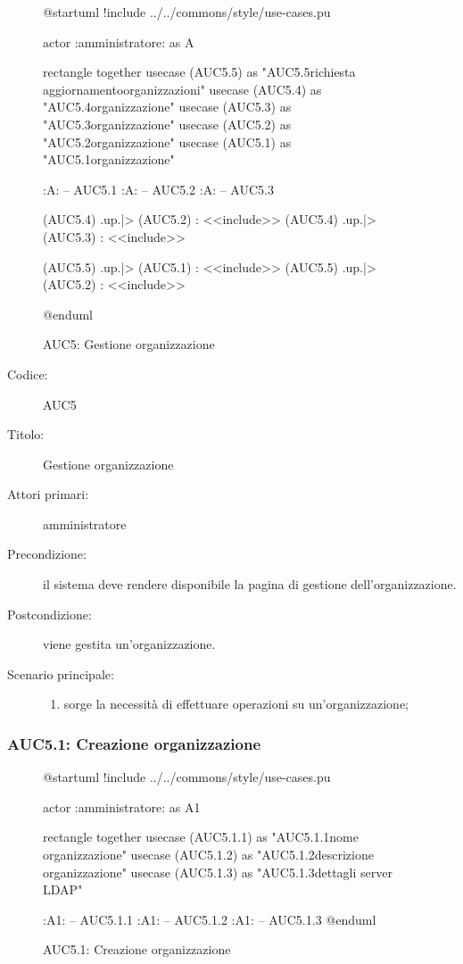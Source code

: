 \documentclass[../../../analisi-dei-requisiti.tex]{subfiles}
\begin{document}
\begin{figure}[H]
  \centering
  \begin{plantuml}
  @startuml
  !include ../../commons/style/use-cases.pu

  actor :amministratore: as A

  rectangle {
    together {
      usecase (AUC5.5) as "AUC5.5\nInvio richiesta aggiornamento\nlista organizzazioni"
      usecase (AUC5.4) as "AUC5.4\nSeleziona organizzazione"
      usecase (AUC5.3) as "AUC5.3\nModifica organizzazione"
      usecase (AUC5.2) as "AUC5.2\nEliminazione organizzazione"
      usecase (AUC5.1) as "AUC5.1\nCreazione organizzazione"
    }
  }

  :A: -- AUC5.1
  :A: -- AUC5.2
  :A: -- AUC5.3

  (AUC5.4) .up.|> (AUC5.2) : <<include>>
  (AUC5.4) .up.|> (AUC5.3) : <<include>>

  (AUC5.5) .up.|> (AUC5.1) : <<include>>
  (AUC5.5) .up.|> (AUC5.2) : <<include>>

  @enduml
  \end{plantuml}
  \caption{AUC5: Gestione organizzazione}
  \label{fig:AUC5}
\end{figure}

\begin{description}
  \item[Codice:] AUC5
  \item[Titolo:] Gestione organizzazione
  \item[Attori primari:] amministratore
  \item[Precondizione:] il sistema deve rendere disponibile la pagina di gestione dell'organizzazione.
  \item[Postcondizione:] viene gestita un'organizzazione.
  \item[Scenario principale:]
  \begin{enumerate}
    \item sorge la necessità di effettuare operazioni su un'organizzazione;
  \end{enumerate}
\end{description}

\subsubsection{AUC5.1: Creazione organizzazione}%
  \label{subs:AUC5.1}

  \begin{figure}[H]
    \centering
    \begin{plantuml}
    @startuml
    !include ../../commons/style/use-cases.pu

    actor :amministratore: as A1

    rectangle {
      together {
        usecase (AUC5.1.1) as "AUC5.1.1\nInserisci nome organizzazione"
        usecase (AUC5.1.2) as "AUC5.1.2\nInserisci descrizione organizzazione"
        usecase (AUC5.1.3) as "AUC5.1.3\nConfigurazione dettagli server LDAP"
      }
    }

    :A1: -- AUC5.1.1
    :A1: -- AUC5.1.2
    :A1: -- AUC5.1.3
    @enduml
    \end{plantuml}
    \caption{AUC5.1: Creazione organizzazione}
    \label{fig:AUC5_1}
  \end{figure}
\end{document}
